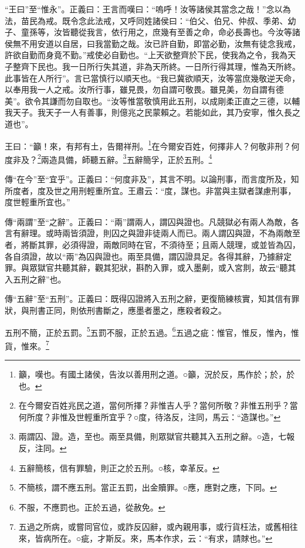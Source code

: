 {\noindent\shu{}\fzkt “王曰”至“惟永”。正義曰：王言而嘆曰：“嗚呼！汝等諸侯其當念之哉！”念以為法，苗民為戒。既令念此法戒，又呼同姓諸侯曰：“伯父、伯兄、仲叔、季弟、幼子、童孫等，汝皆聽從我言，依行用之，庶幾有至善之命，命必長壽也。今汝等諸侯無不用安道以自居，曰我當勤之哉。汝已許自勤，即當必勤，汝無有徒念我戒，許欲自勤而身竟不勤。”戒使必自勤也。“上天欲整齊於下民，使我為之令，我為天子整齊下民也。我一日所行失其道，非為天所終。一日所行得其理，惟為天所終。此事皆在人所行”。言已當慎行以順天也。“我已冀欲順天，汝等當庶幾敬逆天命，以奉用我一人之戒。汝所行事，雖見畏，勿自謂可敬畏。雖見美，勿自謂有德美”。欲令其謙而勿自取也。“汝等惟當敬慎用此五刑，以成剛柔正直之三德，以輔我天子。我天子一人有善事，則億兆之民蒙賴之。若能如此，其乃安寧，惟久長之道也”。 \par}

王曰：“籲！來，有邦有土，告爾祥刑。\footnote{籲，嘆也。有國土諸侯，告汝以善用刑之道。○籲，況於反，馬作於；於，於也。}在今爾安百姓，何擇非人？何敬非刑？何度非及？\footnote{在今爾安百姓兆民之道，當何所擇？非惟吉人乎？當何所敬？非惟五刑乎？當何所度？非惟及世輕重所宜乎？○度，待洛反，注同，馬云：“造謀也。”}兩造具備，師聽五辭。\footnote{兩謂囚、證。造，至也。兩至具備，則眾獄官共聽其入五刑之辭。○造，七報反，注同。}五辭簡孚，正於五刑。\footnote{五辭簡核，信有罪驗，則正之於五刑。○核，幸革反。}


{\noindent\zhuan{}\fzbyks 傳“在今”至“宜乎”。正義曰：“何度非及”，其言不明。以論刑事，而言度所及，知所度者，度及世之用刑輕重所宜。王肅云：“度，謀也。非當與主獄者謀慮刑事，度世輕重所宜也。” \par}

{\noindent\zhuan{}\fzbyks 傳“兩謂”至“之辭”。正義曰：“兩”謂兩人，謂囚與證也。凡競獄必有兩人為敵，各言有辭理。或時兩皆須證，則囚之與證非徒兩人而已。兩人謂囚與證，不為兩敵至者，將斷其罪，必須得證，兩敵同時在官，不須待至；且兩人競理，或並皆為囚，各自須證，故以“兩”為囚與證也。兩至具備，謂囚證具足。各得其辭，乃據辭定罪。與眾獄官共聽其辭，觀其犯狀，斟酌入罪，或入墨劓，或入宮剕，故云“聽其入五刑之辭”也。 \par}

{\noindent\zhuan{}\fzbyks 傳“五辭”至“五刑”。正義曰：既得囚證將入五刑之辭，更復簡練核實，知其信有罪狀，與刑書正同，則依刑書斷之，應墨者墨之，應殺者殺之。 \par}

五刑不簡，正於五罰。\footnote{不簡核，謂不應五刑。當正五罰，出金贖罪。○應，應對之應，下同。}五罰不服，正於五過。\footnote{不服，不應罰也。正於五過，從赦免。}五過之疵：惟官，惟反，惟內，惟貨，惟來。\footnote{五過之所病，或嘗同官位，或詐反囚辭，或內親用事，或行貨枉法，或舊相往來，皆病所在。○疵，才斯反。來，馬本作求，云：“有求，請賕也。”}


